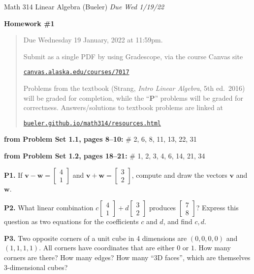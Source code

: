 \documentclass[12pt]{amsart}
\newcommand{\bv}{\mathbf{v}}
\newcommand{\bw}{\mathbf{w}}
\newcommand{\ds}{\displaystyle}
\newcommand{\prob}[1]{\bigskip\noindent\textbf{#1}\quad }
\newcommand{\probset}[2]{\prob{from Problem Set #1, pages #2:}}
\begin{document}
\scriptsize \noindent Math 314 Linear Algebra (Bueler) \hfill \emph{Due Wed 1/19/22}
\normalsize\medskip

\Large
\centerline{\textbf{Homework \#1}}

\normalsize
\bigskip
\begin{quote}
Due Wednesday 19 January, 2022 at 11:59pm.

\medskip
\noindent Submit as a single PDF by using Gradescope, via the course Canvas site

\href{https://canvas.alaska.edu/courses/7017}{\texttt{canvas.alaska.edu/courses/7017}}

\noindent Problems from the textbook (Strang, \emph{Intro Linear Algebra}, 5th ed.~2016) will be graded for completion, while the ``\textbf{P}'' problems will be graded for correctness.  Answers/solutions to textbook problems are linked at

\href{https://bueler.github.io/math314/resources.html}{\texttt{bueler.github.io/math314/resources.html}}
\end{quote}
\medskip

\thispagestyle{empty}

\bigskip

\probset{1.1}{8--10} \# 2, 6, 8, 11, 13, 22, 31

\probset{1.2}{18--21} \# 1, 2, 3, 4, 6, 14, 21, 34

\prob{P1.}  If $\ds \bv - \bw = \begin{bmatrix} 4 \\ 1 \end{bmatrix}$ and $\ds \bv + \bw = \begin{bmatrix} 3 \\ 2 \end{bmatrix}$, compute and draw the vectors $\bv$ and $\bw$.

\prob{P2.}  What linear combination $\ds c \begin{bmatrix} 4 \\ 1 \end{bmatrix} + d \begin{bmatrix} 3 \\ 2 \end{bmatrix}$ produces $\ds \begin{bmatrix} 7 \\ 8 \end{bmatrix}$?  Express this question as two equations for the coefficients $c$ and $d$, and find $c,d$.

\prob{P3.}  Two opposite corners of a unit cube in 4 dimensions are $(0,0,0,0)$ and $(1,1,1,1)$.  All corners have coordinates that are either $0$ or $1$.  How many corners are there?  How many edges?  How many ``3D faces'', which are themselves 3-dimensional cubes?
\end{document}
